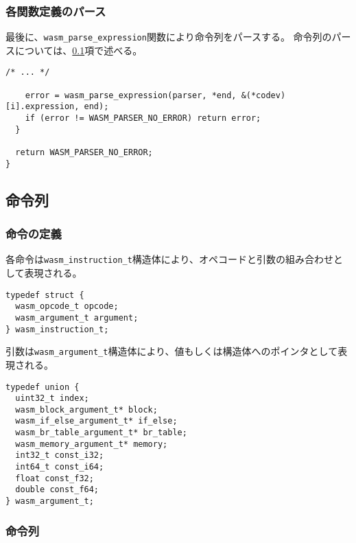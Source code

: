 \subsubsection{各関数定義のパース}

最後に、\verb|wasm_parse_expression|関数により命令列をパースする。
命令列のパースについては、\ref{subsec:parse_expression}項で述べる。

\begin{lstlisting}[caption=コードセクションのパース,label=lst:parse_sleb128]
    /* ... */

    error = wasm_parse_expression(parser, *end, &(*codev)[i].expression, end);
    if (error != WASM_PARSER_NO_ERROR) return error;
  }

  return WASM_PARSER_NO_ERROR;
}
\end{lstlisting}

\subsection{命令列}
\label{subsec:parse_expression}

\subsubsection{命令の定義}

各命令は\verb|wasm_instruction_t|構造体により、オペコードと引数の組み合わせとして表現される。

\begin{lstlisting}[caption=命令を表現する構造体の定義,label=lst:instruction_t]
typedef struct {
  wasm_opcode_t opcode;
  wasm_argument_t argument;
} wasm_instruction_t;
\end{lstlisting}

引数は\verb|wasm_argument_t|構造体により、値もしくは構造体へのポインタとして表現される。

\begin{lstlisting}[caption=命令の引数を表現する構造体の定義,label=lst:argument_t]
typedef union {
  uint32_t index;
  wasm_block_argument_t* block;
  wasm_if_else_argument_t* if_else;
  wasm_br_table_argument_t* br_table;
  wasm_memory_argument_t* memory;
  int32_t const_i32;
  int64_t const_i64;
  float const_f32;
  double const_f64;
} wasm_argument_t;
\end{lstlisting}

\subsubsection{命令列}

